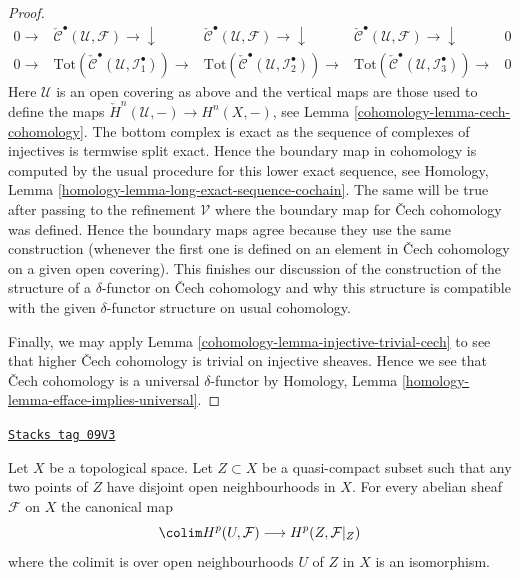 \begin{proof}
$$
\begin{array}{ccccc}0 \longrightarrow & \check{\mathcal{C}}^\bullet(\mathcal{U}, \mathcal{F}) \longrightarrow\downarrow & \check{\mathcal{C}}^\bullet(\mathcal{U}, \mathcal{F}) \longrightarrow\downarrow & \check{\mathcal{C}}^\bullet(\mathcal{U}, \mathcal{F}) \longrightarrow\downarrow & 0 \\ 0 \longrightarrow & \text{Tot}(\check{\mathcal{C}}^\bullet(\mathcal{U}, \mathcal{I}_1^\bullet))
\longrightarrow & \text{Tot}(\check{\mathcal{C}}^\bullet(\mathcal{U}, \mathcal{I}_2^\bullet))
\longrightarrow & \text{Tot}(\check{\mathcal{C}}^\bullet(\mathcal{U}, \mathcal{I}_3^\bullet))
\longrightarrow & 0\end{array}
$$
Here $\mathcal{U}$ is an open covering as above and
the vertical maps are those used to define the maps
$\check{H}^n(\mathcal{U}, -) \to H^n(X, -)$, see
Lemma \ref{cohomology-lemma-cech-cohomology}.
The bottom complex is exact as the sequence of
complexes of injectives is termwise split exact.
Hence the boundary map in cohomology is computed
by the usual procedure for this lower exact sequence, see
Homology, Lemma \ref{homology-lemma-long-exact-sequence-cochain}.
The same will be true after passing to the refinement
$\mathcal{V}$ where the boundary map for {\v C}ech cohomology
was defined. Hence the boundary maps agree because they
use the same construction (whenever the first one is defined
on an element in {\v C}ech cohomology on a given open covering).
This finishes our discussion of the construction of
the structure of a $\delta$-functor on {\v C}ech cohomology
and why this structure is compatible with the given
$\delta$-functor structure on usual cohomology.

\medskip\noindent
Finally, we may apply Lemma \ref{cohomology-lemma-injective-trivial-cech}
to see that higher {\v C}ech cohomology is trivial on injective
sheaves. Hence we see that {\v C}ech cohomology is a universal
$\delta$-functor by
Homology, Lemma \ref{homology-lemma-efface-implies-universal}.
\end{proof}

\begin{lemma}
\label{cohomology-lemma-cohomology-of-closed}
\href{https://stacks.math.columbia.edu/tag/09V3}{\texttt{Stacks tag 09V3}}

\begin{reference}
\cite[Expose V bis, 4.1.3]{SGA4}
\end{reference}
Let $X$ be a topological space. Let $Z \subset X$ be a quasi-compact subset
such that any two points of $Z$ have disjoint open neighbourhoods in $X$.
For every abelian sheaf $\mathcal{F}$ on $X$ the canonical
map
$$
\colim H^p(U, \mathcal{F})
\longrightarrow
H^p(Z, \mathcal{F}|_Z)
$$
where the colimit is over open neighbourhoods $U$ of $Z$ in $X$
is an isomorphism.
\end{lemma}


